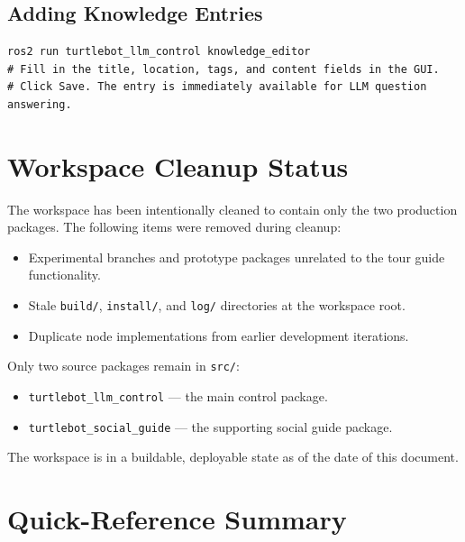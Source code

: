 \documentclass[12pt,a4paper]{report}
\newcommand{\pkg}[1]{\texttt{\color{RoyalBlue}#1}}
\begin{document}
\section{Adding Knowledge Entries}

\begin{lstlisting}[style=bashstyle]
ros2 run turtlebot_llm_control knowledge_editor
# Fill in the title, location, tags, and content fields in the GUI.
# Click Save. The entry is immediately available for LLM question answering.
\end{lstlisting}

\chapter{Workspace Cleanup Status}
\label{ch:cleanup}

The workspace has been intentionally cleaned to contain only the two production
packages.  The following items were removed during cleanup:

\begin{itemize}[leftmargin=2em]
  \item Experimental branches and prototype packages unrelated to the tour
        guide functionality.
  \item Stale \texttt{build/}, \texttt{install/}, and \texttt{log/}
        directories at the workspace root.
  \item Duplicate node implementations from earlier development iterations.
\end{itemize}

\begin{tcolorbox}[notebox, title=Clean Workspace State]
  Only two source packages remain in \texttt{src/}:
  \begin{itemize}
    \item \pkg{turtlebot\_llm\_control} — the main control package.
    \item \pkg{turtlebot\_social\_guide} — the supporting social guide package.
  \end{itemize}
  The workspace is in a buildable, deployable state as of the date of this
  document.
\end{tcolorbox}

\chapter{Quick-Reference Summary}
\label{ch:quickref}
\end{document}
